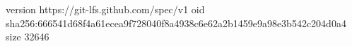 version https://git-lfs.github.com/spec/v1
oid sha256:666541d68f4a61ecea9f728040f8a4938c6e62a2b1459e9a98e3b542c204d0a4
size 32646

